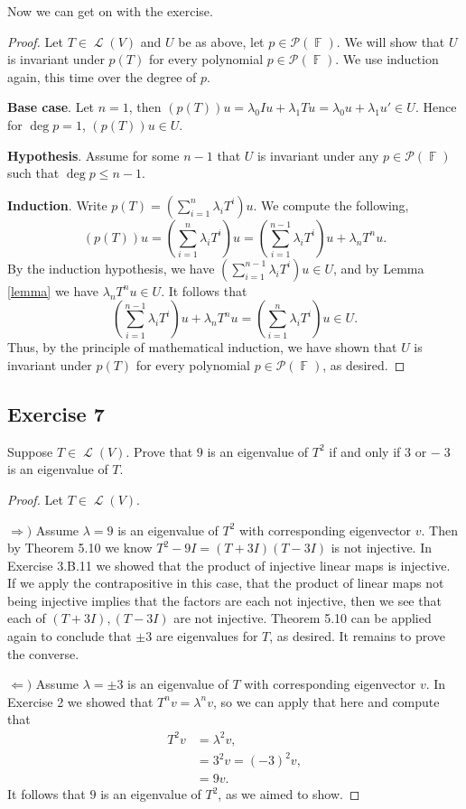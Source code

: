 \documentclass[letterpaper, 12pt]{amsart}
\DeclareMathOperator{\F}{\mathbb{F}}				%
\DeclareMathOperator{\Ell}{\mathscr{L}}				%
\theoremstyle{definition}  							%
\newcommand{\Ra}{\Rightarrow}                   %
\newcommand{\La}{\Leftarrow}                    %
\begin{document}
		Now we can get on with the exercise.
		\begin{proof}
		Let $T \in \Ell(V)$ and $U$ be as above, let $p \in \mathcal{P}(\F)$.
		We will show that $U$ is invariant under $p(T)$ for every polynomial $p \in \mathcal{P}(\F)$.
		We use induction again, this time over the degree of $p$.

		\textbf{Base case}. Let $n=1$, then $(p(T))u = \lambda_{0}Iu + \lambda_{1}Tu = \lambda_{0}u + \lambda_{1}u' \in U$.
		Hence for $\deg p = 1$, $(p(T))u \in U$.

		\textbf{Hypothesis}. Assume for some $n-1$ that $U$ is invariant under any $p \in \mathcal{P}(\F)$ such that $\deg p \leq n-1$.

		\textbf{Induction}. Write $p(T) = \left( \sum_{i=1}^{n} \lambda_{i}T^{i} \right)u$.
		We compute the following, $$(p(T))u = \left( \sum_{i=1}^{n} \lambda_{i}T^{i} \right)u = \left( \sum_{i=1}^{n-1} \lambda_{i}T^{i} \right)u + \lambda_{n}T^{n}u.$$
		By the induction hypothesis, we have $\left( \sum_{i=1}^{n-1} \lambda_{i}T^{i} \right)u \in U$, and by Lemma \ref{lemma} we have $\lambda_{n}T^{n}u \in U$.
		It follows that $$\left( \sum_{i=1}^{n-1} \lambda_{i}T^{i} \right)u + \lambda_{n}T^{n}u = \left( \sum_{i=1}^{n} \lambda_{i}T^{i} \right)u \in U.$$
		Thus, by the principle of mathematical induction, we have shown that $U$ is invariant under $p(T)$ for every polynomial $p \in \mathcal{P}(\F)$, as desired.
		\end{proof}

		\subsection*{Exercise 7}
		Suppose $T \in \Ell(V)$. 
		Prove that $9$ is an eigenvalue of $T^2$ if and only if $3$ or $-􏰋3$ is an eigenvalue of $T$.

		\begin{proof}
		Let $T \in \Ell(V)$.

		$\Ra)$ Assume $\lambda = 9$ is an eigenvalue of $T^2$ with corresponding eigenvector $v$.
		Then by Theorem 5.10 we know $T^2-9I = (T+3I)(T-3I)$ is not injective.
		In Exercise 3.B.11 we showed that the product of injective linear maps is injective.
		If we apply the contrapositive in this case, that the product of linear maps not being injective implies that the factors are each not injective, then we see that each of $(T+3I),(T-3I)$ are not injective.
		Theorem 5.10 can be applied again to conclude that $\pm3$ are eigenvalues for $T$, as desired.
		It remains to prove the converse.

		$\La)$ Assume $\lambda = \pm3$ is an eigenvalue of $T$ with corresponding eigenvector $v$.
		In Exercise 2 we showed that $T^nv = \lambda^nv$, so we can apply that here and compute that 
			\begin{align*}
				T^{2}v &= \lambda^2v, \\
				&= 3^2v = (-3)^2v, \\
				&= 9v.
			\end{align*}
		It follows that $9$ is an eigenvalue of $T^2$, as we aimed to show.
		\end{proof}
\end{document}
